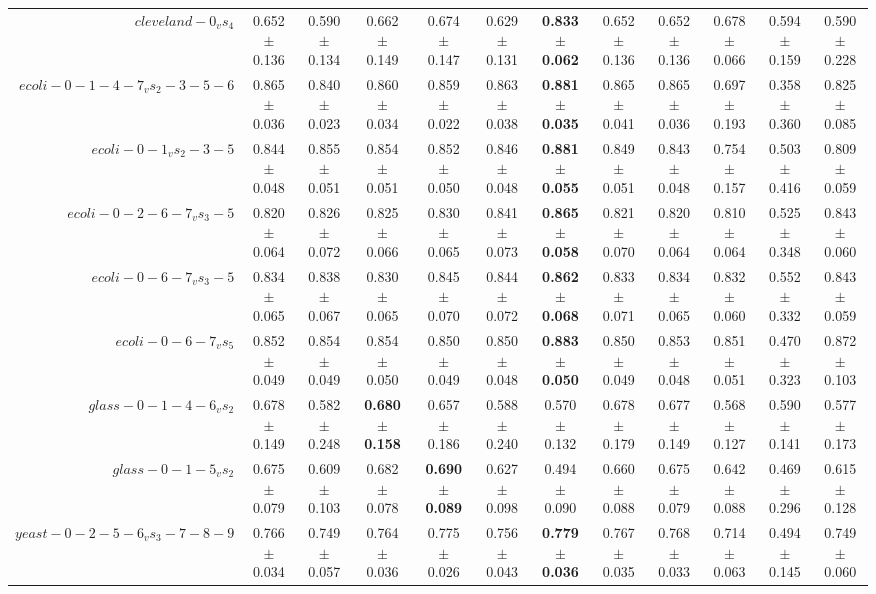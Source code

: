 \begin{table}[!ht]
{\begin{tabular}{r c c c c c c c c c c c}
$cleveland-0_vs_4$ & 0.652 $\pm$ 0.136 & 0.590 $\pm$ 0.134 & 0.662 $\pm$ 0.149 & 0.674 $\pm$ 0.147 & 0.629 $\pm$ 0.131 & \textbf{0.833 $\pm$ 0.062} & 0.652 $\pm$ 0.136 & 0.652 $\pm$ 0.136 & 0.678 $\pm$ 0.066 & 0.594 $\pm$ 0.159 & 0.590 $\pm$ 0.228 \\
$ecoli-0-1-4-7_vs_2-3-5-6$ & 0.865 $\pm$ 0.036 & 0.840 $\pm$ 0.023 & 0.860 $\pm$ 0.034 & 0.859 $\pm$ 0.022 & 0.863 $\pm$ 0.038 & \textbf{0.881 $\pm$ 0.035} & 0.865 $\pm$ 0.041 & 0.865 $\pm$ 0.036 & 0.697 $\pm$ 0.193 & 0.358 $\pm$ 0.360 & 0.825 $\pm$ 0.085 \\
$ecoli-0-1_vs_2-3-5$ & 0.844 $\pm$ 0.048 & 0.855 $\pm$ 0.051 & 0.854 $\pm$ 0.051 & 0.852 $\pm$ 0.050 & 0.846 $\pm$ 0.048 & \textbf{0.881 $\pm$ 0.055} & 0.849 $\pm$ 0.051 & 0.843 $\pm$ 0.048 & 0.754 $\pm$ 0.157 & 0.503 $\pm$ 0.416 & 0.809 $\pm$ 0.059 \\
$ecoli-0-2-6-7_vs_3-5$ & 0.820 $\pm$ 0.064 & 0.826 $\pm$ 0.072 & 0.825 $\pm$ 0.066 & 0.830 $\pm$ 0.065 & 0.841 $\pm$ 0.073 & \textbf{0.865 $\pm$ 0.058} & 0.821 $\pm$ 0.070 & 0.820 $\pm$ 0.064 & 0.810 $\pm$ 0.064 & 0.525 $\pm$ 0.348 & 0.843 $\pm$ 0.060 \\
$ecoli-0-6-7_vs_3-5$ & 0.834 $\pm$ 0.065 & 0.838 $\pm$ 0.067 & 0.830 $\pm$ 0.065 & 0.845 $\pm$ 0.070 & 0.844 $\pm$ 0.072 & \textbf{0.862 $\pm$ 0.068} & 0.833 $\pm$ 0.071 & 0.834 $\pm$ 0.065 & 0.832 $\pm$ 0.060 & 0.552 $\pm$ 0.332 & 0.843 $\pm$ 0.059 \\
$ecoli-0-6-7_vs_5$ & 0.852 $\pm$ 0.049 & 0.854 $\pm$ 0.049 & 0.854 $\pm$ 0.050 & 0.850 $\pm$ 0.049 & 0.850 $\pm$ 0.048 & \textbf{0.883 $\pm$ 0.050} & 0.850 $\pm$ 0.049 & 0.853 $\pm$ 0.048 & 0.851 $\pm$ 0.051 & 0.470 $\pm$ 0.323 & 0.872 $\pm$ 0.103 \\
$glass-0-1-4-6_vs_2$ & 0.678 $\pm$ 0.149 & 0.582 $\pm$ 0.248 & \textbf{0.680 $\pm$ 0.158} & 0.657 $\pm$ 0.186 & 0.588 $\pm$ 0.240 & 0.570 $\pm$ 0.132 & 0.678 $\pm$ 0.179 & 0.677 $\pm$ 0.149 & 0.568 $\pm$ 0.127 & 0.590 $\pm$ 0.141 & 0.577 $\pm$ 0.173 \\
$glass-0-1-5_vs_2$ & 0.675 $\pm$ 0.079 & 0.609 $\pm$ 0.103 & 0.682 $\pm$ 0.078 & \textbf{0.690 $\pm$ 0.089} & 0.627 $\pm$ 0.098 & 0.494 $\pm$ 0.090 & 0.660 $\pm$ 0.088 & 0.675 $\pm$ 0.079 & 0.642 $\pm$ 0.088 & 0.469 $\pm$ 0.296 & 0.615 $\pm$ 0.128 \\
$yeast-0-2-5-6_vs_3-7-8-9$ & 0.766 $\pm$ 0.034 & 0.749 $\pm$ 0.057 & 0.764 $\pm$ 0.036 & 0.775 $\pm$ 0.026 & 0.756 $\pm$ 0.043 & \textbf{0.779 $\pm$ 0.036} & 0.767 $\pm$ 0.035 & 0.768 $\pm$ 0.033 & 0.714 $\pm$ 0.063 & 0.494 $\pm$ 0.145 & 0.749 $\pm$ 0.060 \\

\end{tabular}}
\end{table}
